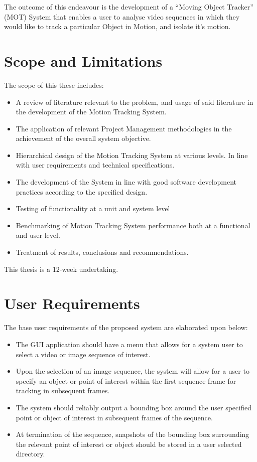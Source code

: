 The outcome of this endeavour is the development of a ``Moving Object Tracker''
(MOT) System that enables a user to analyse video sequences in which they would like
to track a particular Object in Motion, and isolate it's motion.

\section{Scope and Limitations}\label{introduction_scope}
The scope of this these includes: 
\begin{itemize}
    \item A review of literature relevant to the problem, and usage of
        said literature in the development of the Motion Tracking System.
    \item The application of relevant Project Management methodologies in the
        achievement of the overall system objective.
    \item Hierarchical design of the Motion Tracking System at various levels.
        In line with user requirements and technical specifications.
    \item The development of the System in line with good software development
        practices according to the specified design.
    \item Testing of functionality at a unit and system level
    \item Benchmarking of Motion Tracking System performance both at a
        functional and user level.
    \item Treatment of results, conclusions and recommendations.
\end{itemize}

This thesis is a 12-week undertaking.

\section{User Requirements}\label{introduction_user_requirements}
The base user requirements of the proposed system are elaborated upon below:
\begin{itemize}
    \item The GUI application should have a menu that allows for a system
        user to select a video or image sequence of interest.
    \item Upon the selection of an image sequence, the system will allow for a
        user to specify an object or point of interest within the first sequence
        frame for tracking in subsequent frames.
    \item The system should reliably output a bounding box around the user
        specified point or object of interest in subsequent frames of the
        sequence. 
    \item At termination of the sequence, snapshots of the bounding box
        surrounding the relevant point of interest or object should be stored in
        a user selected directory.
\end{itemize}

